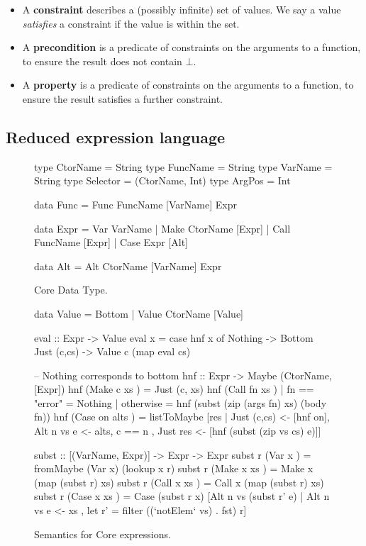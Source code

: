 \documentclass[preprint]{sigplanconf}
\begin{document}
\begin{itemize}
\item A \textbf{constraint} describes a (possibly infinite) set of values. We say a value \textit{satisfies} a constraint if the value is within the set.
\item A \textbf{precondition} is a predicate of constraints on the arguments to a function, to ensure the result does not contain $\bot{}$.
\item A \textbf{property}     is a predicate of constraints on the arguments to a function, to ensure the result satisfies a further constraint.
\end{itemize}

\subsection{Reduced expression language}
\label{sec:core}

\begin{figure}
\begin{code}
type CtorName  =  String
type FuncName  =  String
type VarName   =  String
type Selector  =  (CtorName, Int)
type ArgPos    =  Int

data Func  =  Func FuncName [VarName] Expr

data Expr  =  Var   VarName
           |  Make  CtorName  [Expr]
           |  Call  FuncName  [Expr]
           |  Case  Expr      [Alt]

data Alt   =  Alt CtorName [VarName] Expr
\end{code}
\caption{Core Data Type.}
\label{fig:core}
\end{figure}

\begin{figure}
\begin{code}
data Value = Bottom | Value CtorName [Value]

eval :: Expr -> Value
eval x = case  hnf x of
               Nothing      -> Bottom
               Just (c,cs)  -> Value c (map eval cs)

-- Nothing corresponds to bottom
hnf :: Expr -> Maybe (CtorName, [Expr])
hnf (Make  c   xs    )  =  Just (c, xs)
hnf (Call  fn  xs    )
    | fn == "error"  = Nothing
    | otherwise      = hnf (subst (zip (args fn) xs) (body fn))
hnf (Case  on  alts  )  =  listToMaybe [res
       |  Just (c,cs) <- [hnf on], Alt n vs e <- alts, c == n
       ,  Just res <- [hnf (subst (zip vs cs) e)]]

subst :: [(VarName, Expr)] -> Expr -> Expr
subst r (Var   x     ) = fromMaybe (Var x) (lookup x r)
subst r (Make  x xs  ) = Make  x (map (subst r) xs)
subst r (Call  x xs  ) = Call  x (map (subst r) xs)
subst r (Case  x xs  ) = Case (subst r x)
    [Alt n vs (subst r' e) | Alt n vs e <- xs
    , let r' = filter ((`notElem` vs) . fst) r]
\end{code}
\caption{Semantics for Core expressions.}
\label{fig:semantics}
\end{figure}
\end{document}
